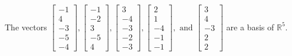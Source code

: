 \begin{exercise}
\begin{exerciseStatement}
  \end{exerciseStatement}
  \begin{exerciseAnswer}
   The vectors \(\left[\begin{array}{r}
-1 \\
4 \\
-3 \\
-5 \\
-4
\end{array}\right] , \left[\begin{array}{r}
-1 \\
-2 \\
3 \\
-5 \\
4
\end{array}\right] , \left[\begin{array}{r}
3 \\
-4 \\
-3 \\
-2 \\
-3
\end{array}\right] , \left[\begin{array}{r}
2 \\
1 \\
-4 \\
-1 \\
-1
\end{array}\right] , \text{ and } \left[\begin{array}{r}
3 \\
4 \\
-3 \\
2 \\
2
\end{array}\right]\) 
  	 are  a basis of \(\mathbb{R}^5\).
  


  \end{exerciseAnswer}
\end{exercise}